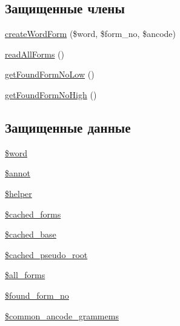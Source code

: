 \subsection*{Защищенные члены}
\begin{DoxyCompactItemize}
\item 
\hyperlink{classphpMorphy__WordDescriptor_a8af15e0fbbb3c7a5c7cfb7b68eab7311}{createWordForm} (\$word, \$form\_\-no, \$ancode)
\item 
\hyperlink{classphpMorphy__WordDescriptor_a64dcf01200d1ba78fa8fdc3b4a5b70fa}{readAllForms} ()
\item 
\hyperlink{classphpMorphy__WordDescriptor_a2401bc461336b4bd3d42767fac22191f}{getFoundFormNoLow} ()
\item 
\hyperlink{classphpMorphy__WordDescriptor_a89dff0dcb1eb0758821107e913989be1}{getFoundFormNoHigh} ()
\end{DoxyCompactItemize}
\subsection*{Защищенные данные}
\begin{DoxyCompactItemize}
\item 
\hyperlink{classphpMorphy__WordDescriptor_a285cd23cacf54e108d55aa508045d066}{\$word}
\item 
\hyperlink{classphpMorphy__WordDescriptor_acfeac68ebeb66c776523b5db14303162}{\$annot}
\item 
\hyperlink{classphpMorphy__WordDescriptor_acba78adb26fe19aa780577b8d8a7dc19}{\$helper}
\item 
\hyperlink{classphpMorphy__WordDescriptor_aa18e3590050c6570f48a5c4e356d80d0}{\$cached\_\-forms}
\item 
\hyperlink{classphpMorphy__WordDescriptor_a942ddc98031167cf6013cbc047bbd13b}{\$cached\_\-base}
\item 
\hyperlink{classphpMorphy__WordDescriptor_a54ef640ed6db1606fb1aa3bce8982d0e}{\$cached\_\-pseudo\_\-root}
\item 
\hyperlink{classphpMorphy__WordDescriptor_a2ddd66c4631cbbab7deb058377dc57d2}{\$all\_\-forms}
\item 
\hyperlink{classphpMorphy__WordDescriptor_a0f18877bd1b2b6e6cdfc396c0728880d}{\$found\_\-form\_\-no}
\item 
\hyperlink{classphpMorphy__WordDescriptor_a23529fb544099cbaf991a806893ca91b}{\$common\_\-ancode\_\-grammems}
\end{DoxyCompactItemize}



